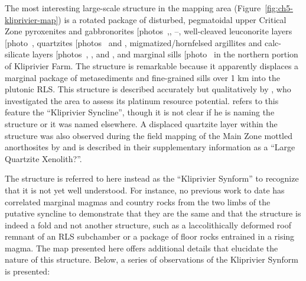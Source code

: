 The most interesting large-scale structure in the mapping area
(Figure~\ref{fig:ch5-kliprivier-map}) is a
rotated package of disturbed, pegmatoidal upper Critical Zone
pyroxenites and gabbronorites {[}photos~,, --\ChFivePhoto{78}{]}, well-cleaved
leuconorite layers {[}photo~\ChFivePhoto{63}{]}, quartzites {[}photos~ and \ChFivePhoto{124}{]},
migmatized/hornfelsed argillites and calc-silicate layers {[}photos~,
, and \ChFivePhoto{125}{]}, and marginal sills {[}photo~\ChFivePhoto{57}{]} in the northern
portion of Kliprivier Farm. The structure is remarkable because it
apparently displaces a marginal package of metasediments and
fine-grained sills over 1 km into the plutonic RLS. This
structure is described accurately but qualitatively by
\citet{vandermerwe2007}, who investigated the area to assess its platinum resource
potential. \citet{vandermerwe2007} refers to this feature the ``Kliprivier
Syncline'', though it is not clear if he is naming the structure or it
was named elsewhere. A displaced quartzite layer within the structure
was also observed during the field mapping of the Main Zone mottled
anorthosites by \citet{latypovetal2022} and is described in their
supplementary information as a ``Large Quartzite Xenolith?''.

The structure is referred to here instead as the ``Kliprivier Synform''
to recognize that it is not yet well understood. For instance, no
previous work to date has correlated marginal magmas and country rocks
from the two limbs of the putative syncline to demonstrate that they are
the same and that the structure is indeed a fold and not another
structure, such as a laccolithically deformed roof remnant of an RLS
subchamber or a package of floor rocks entrained in a rising magma. The
map presented here offers additional details that elucidate the nature
of this structure. Below, a series of observations of the Kliprivier
Synform is presented:

